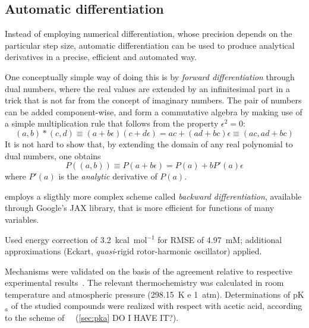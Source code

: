 \subsection{Automatic differentiation}

Instead of employing numerical differentiation,
whose precision depends on the
particular step size,
automatic differentiation can be used to produce
analytical derivatives in a precise,
efficient and automated way.

One conceptually simple way of doing this is by \emph{forward differentiation}
through dual numbers,
where the real values are extended by an infinitesimal
part in a trick that is not far from the concept of imaginary numbers.
The pair of numbers can be added component-wise,
and form a commutative algebra
by making use of a simple multiplication rule that follows from the property
$\epsilon^2 = 0$:
\begin{equation}
	(a,
	b) * (c,
	d)
	\equiv (a + b\epsilon)(c + d\epsilon)
	= a c + (a d + b c)\epsilon
	\equiv (a c,
	a d + b c)
\end{equation}
It is not hard to show that,
by extending the domain of any real polynomial to
dual numbers,
one obtains
\begin{equation}
	P((a,
	b)) \equiv P(a + b\epsilon) = P(a) + b P'(a) \epsilon
\end{equation}
where $P'(a)$ is the \emph{analytic} derivative of $P(a)$.

\overreact employs a sligthly more complex scheme called
\emph{backward differentiation},
available through Google's JAX library,
that
is more efficient for functions of many variables.

Used energy correction of 3.2~kcal~mol$^{-1}$ for RMSE of 4.97~mM;\@
additional approximations (Eckart,
\emph{quasi}-rigid rotor-harmonic oscillator) applied.

Mechanisms were validated on the basis of the agreement relative to respective experimental results~\cite{Kirby_1972,Jung_2005}.
The relevant thermochemistry was calculated in room temperature and atmospheric pressure (298.15~K e 1~atm).
Determinations of pK$_a$ of the studied compounds were realized with respect with acetic acid,
according to the scheme of~\citeauthor{Ding_2009}~\cite{Ding_2009} (\cref{sec:pka} DO I HAVE IT?).

